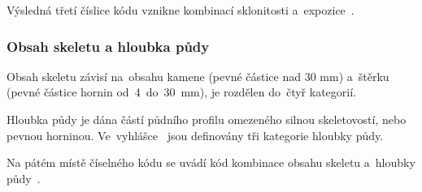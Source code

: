 Výsledná třetí číslice kódu  vznikne kombinací sklonitosti a~expozice~\citep{vyhlaska_327}.

\subsubsection{Obsah skeletu a hloubka půdy}
\label{hloubka_pudy_obsah_skeletu}

Obsah skeletu závisí na~obsahu kamene (pevné částice nad 30 mm) a~štěrku (pevné částice hornin od~4~do~30~mm), je rozdělen do~čtyř kategorií.

Hloubka půdy je dána částí půdního profilu omezeného silnou skeletovostí, nebo pevnou horninou. Ve~vyhlášce~\citep{vyhlaska_327} jsou definovány tři kategorie hloubky půdy.

Na pátém místě číselného kódu  se uvádí kód kombinace obsahu skeletu a~hloubky půdy~\citep{vyhlaska_327}.
